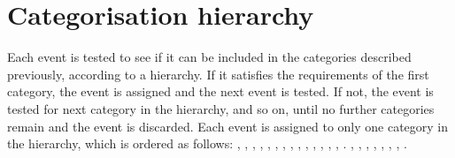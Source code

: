 \section{Categorisation hierarchy}
\label{cat:sec:hierarchy}

Each event is tested to see if it can be included in the categories described previously, according to a hierarchy. If it satisfies the requirements of the first category, the event is assigned and the next event is tested. If not, the event is tested for next category in the hierarchy, and so on, until no further categories remain and the event is discarded. Each event is assigned to only one category in the hierarchy, which is ordered as follows: 
\ifNewAnalysis
\TTHLeptonicTag, \WHLeptonicTag, \ZHLeptonicTag, \VHLeptonicLooseTag, \VHMetTag, \TTHHadronicTag, \VHHadronicTag, , , , , , , , .
\else
\TTHLeptonicTag, \TTHHadronicTag, , , , , , .
\fi
